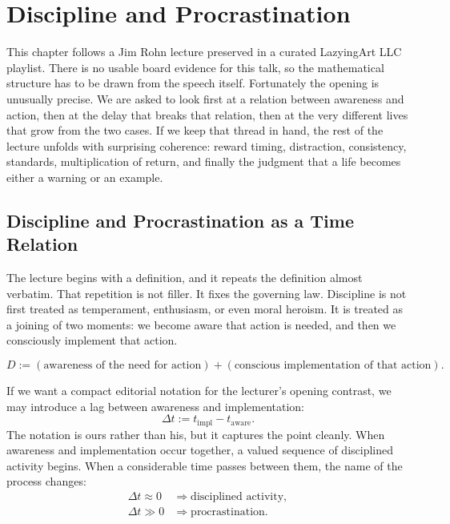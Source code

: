 \chapter{Discipline and Procrastination}

This chapter follows a Jim Rohn lecture preserved in a curated LazyingArt LLC playlist. There is no usable board evidence for this talk, so the mathematical structure has to be drawn from the speech itself. Fortunately the opening is unusually precise. We are asked to look first at a relation between awareness and action, then at the delay that breaks that relation, then at the very different lives that grow from the two cases. If we keep that thread in hand, the rest of the lecture unfolds with surprising coherence: reward timing, distraction, consistency, standards, multiplication of return, and finally the judgment that a life becomes either a warning or an example.

\section{Discipline and Procrastination as a Time Relation}

The lecture begins with a definition, and it repeats the definition almost verbatim. That repetition is not filler. It fixes the governing law. Discipline is not first treated as temperament, enthusiasm, or even moral heroism. It is treated as a joining of two moments: we become aware that action is needed, and then we consciously implement that action.

\begin{equation}
D := (\text{awareness of the need for action}) + (\text{conscious implementation of that action}).
\end{equation}

If we want a compact editorial notation for the lecturer's opening contrast, we may introduce a lag between awareness and implementation:
\begin{equation}
\Delta t := t_{\mathrm{impl}} - t_{\mathrm{aware}}.
\end{equation}
The notation is ours rather than his, but it captures the point cleanly. When awareness and implementation occur together, a valued sequence of disciplined activity begins. When a considerable time passes between them, the name of the process changes:
\begin{align}
\Delta t \approx 0 &\Rightarrow \text{disciplined activity}, \\
\Delta t \gg 0 &\Rightarrow \text{procrastination}.
\end{align}

